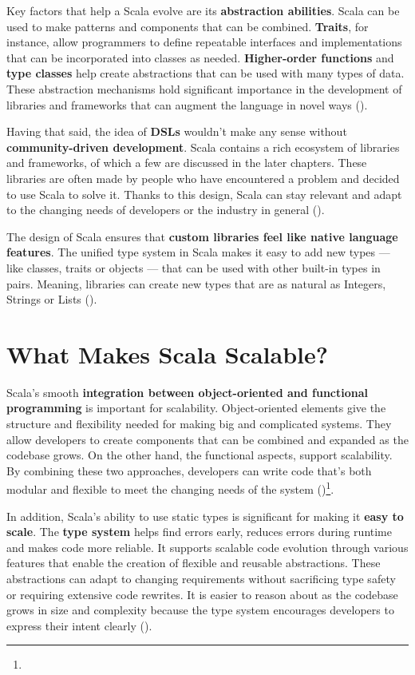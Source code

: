Key factors that help a Scala evolve are its \textbf{abstraction abilities}. Scala can be used to make patterns and components that can be combined. \textbf{Traits}, for instance, allow programmers to define repeatable interfaces and implementations that can be incorporated into classes as needed. \textbf{Higher-order functions} and \textbf{type classes} help create abstractions that can be used with many types of data. These abstraction mechanisms hold significant importance in the development of libraries and frameworks that can augment the language in novel ways (\cite{odersky.etal_2021})\footnotemark[2].

Having that said, the idea of \textbf{DSLs} wouldn't make any sense without \textbf{community-driven development}. Scala contains a rich ecosystem of libraries and frameworks, of which a few are discussed in the later chapters. These libraries are often made by people who have encountered a problem and decided to use Scala to solve it. Thanks to this design, Scala can stay relevant and adapt to the changing needs of developers or the industry in general (\cite{odersky.etal_2021})\footnotemark[2].

The design of Scala ensures that \textbf{custom libraries feel like native language features}. The unified type system in Scala makes it easy to add new types — like classes, traits or objects — that can be used with other built-in types in pairs. Meaning, libraries can create new types that are as natural as Integers, Strings or Lists (\cite{ghoshDSLsAction2011})\footnotemark[3].

\section{What Makes Scala Scalable?}

Scala's smooth \textbf{integration between object-oriented and functional programming} is important for scalability. Object-oriented elements give the structure and flexibility needed for making big and complicated systems. They allow developers to create components that can be combined and expanded as the codebase grows. On the other hand, the functional aspects, support scalability. By combining these two approaches, developers can write code that's both modular and flexible to meet the changing needs of the system (\cite{odersky.etal_2021})\footnote[2]{}.

In addition, Scala's ability to use static types is significant for making it \textbf{easy to scale}. The \textbf{type system} helps find errors early, reduces errors during runtime and makes code more reliable. It supports scalable code evolution through various features that enable the creation of flexible and reusable abstractions. These abstractions can adapt to changing requirements without sacrificing type safety or requiring extensive code rewrites. It is easier to reason about as the codebase grows in size and complexity because the type system encourages developers to express their intent clearly (\cite{odersky.etal_2021})\footnotemark[2].

